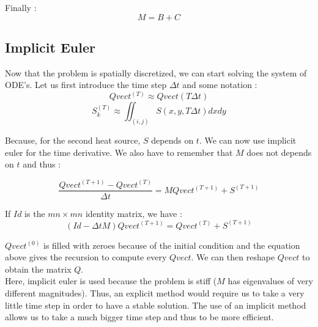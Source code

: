Finally : 
$$M = B + C$$

\subsection{Implicit Euler}

Now that the problem is spatially discretized, we can start solving the system of ODE's. Let us first introduce the time step $\Delta t$ and some notation :
$$Qvect^{(T)} \approx Qvect(T\Delta t)$$
$$S_k^{(T)} \approx \iint_{(i,j)} S(x,y,T\Delta t)dxdy$$

Because, for the second heat source, $S$ depends on $t$. We can now use implicit euler for the time derivative. We also have to remember that $M$ does not depends on $t$ and thus :

$$\frac{Qvect^{(T+1)}-Qvect^{(T)}}{\Delta t} = MQvect^{(T+1)} + S^{(T+1)}$$

If $Id$ is the $mn\times mn$ identity matrix, we have :
$$(Id-\Delta t M)Qvect^{(T+1)} = Qvect^{(T)} + S^{(T+1)}$$

$Qvect^{(0)}$ is filled with zeroes because of the initial condition and the equation above gives the recursion to compute every $Qvect$. We can then reshape $Qvect$ to obtain the matrix $Q$. \\


Here, implicit euler is used because the problem is stiff ($M$ has eigenvalues of very different magnitudes). Thus, an explicit method would require us to take a very little time step in order to have a stable solution. The use of an implicit method allows us to take a much bigger time step and thus to be more efficient.
